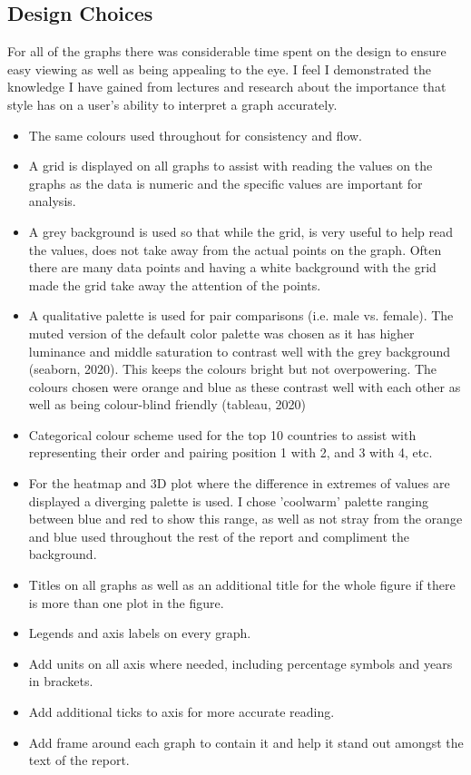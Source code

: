 \documentclass[a4 paper, 12pt]{article}
\begin{document}
        \subsection{Design Choices}
        For all of the graphs there was considerable time spent on the design to ensure easy viewing as well as being appealing to the eye. I feel I demonstrated the knowledge I have gained from lectures and research about the importance that style has on a user's ability to interpret a graph accurately.
            \begin{itemize}
                \item The same colours used throughout for consistency and flow.
                \item A grid is displayed on all graphs to assist with reading the values on the graphs as the data is numeric and the specific values are important for analysis.
                \item A grey background is used so that while the grid, is very useful to help read the values, does not take away from the actual points on the graph. Often there are many data points and having a white background with the grid made the grid take away the attention of the points.
                \item A qualitative palette is used for pair comparisons (i.e. male vs. female). The muted version of the default color palette was chosen as it has higher luminance and middle saturation to contrast well with the grey background (seaborn, 2020). This keeps the colours bright but not overpowering. The colours chosen were orange and blue as these contrast well with each other as well as being colour-blind friendly (tableau, 2020)
                \item Categorical colour scheme used for the top 10 countries to assist with representing their order and pairing position 1 with 2, and 3 with 4, etc.
                \item For the heatmap and 3D plot where the difference in extremes of values are displayed a diverging palette is used. I chose 'coolwarm' palette ranging between blue and red to show this range, as well as not stray from the orange and blue used throughout the rest of the report and compliment the background.
                \item Titles on all graphs as well as an additional title for the whole figure if there is more than one plot in the figure.
                \item Legends and axis labels on every graph.
                \item Add units on all axis where needed, including percentage symbols and years in brackets.
                \item Add additional ticks to axis for more accurate reading.
                \item Add frame around each graph to contain it and help it stand out amongst the text of the report.
            \end{itemize}
\end{document}
